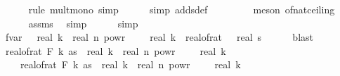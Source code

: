 \begin{isabellebody}
\ \ \ \ \isamarkupfalse%
\ {\isacharparenleft}{\kern0pt}rule\ mult{\isacharunderscore}{\kern0pt}mono{\isacharcomma}{\kern0pt}\ simp{\isacharparenright}{\kern0pt}\isanewline
\ \ \ \ \isamarkupfalse%
\ {\isacharparenleft}{\kern0pt}simp\ add{\isacharcolon}{\kern0pt}sdef{\isacharparenright}{\kern0pt}\ \isanewline
\ \ \ \ \ \ \isamarkupfalse%
\ {\isacharparenleft}{\kern0pt}meson\ of{\isacharunderscore}{\kern0pt}nat{\isacharunderscore}{\kern0pt}ceiling{\isacharparenright}{\kern0pt}\isanewline
\ \ \ \ \isamarkupfalse%
\ assms\ \isamarkupfalse%
\ simp\isanewline
\ \ \ \ \isamarkupfalse%
\ simp\isanewline
\ \ \isamarkupfalse%
\ \isamarkupfalse%
\ f{}{\isacharunderscore}{\kern0pt}var{\isacharunderscore}{\kern0pt}{}{\isacharcolon}{\kern0pt}\ {\isachardoublequoteopen}{}\ {\isacharasterisk}{\kern0pt}\ real\ k\ {\isacharasterisk}{\kern0pt}\ real\ n\ powr\ {\isacharparenleft}{\kern0pt}{}\ {\isacharminus}{\kern0pt}\ {}\ {\isacharslash}{\kern0pt}\ real\ k{\isacharparenright}{\kern0pt}\ {\isasymle}\ {\isacharparenleft}{\kern0pt}real{\isacharunderscore}{\kern0pt}of{\isacharunderscore}{\kern0pt}rat\ {\isasymdelta}{\isacharparenright}{\kern0pt}\ {\isacharasterisk}{\kern0pt}\ {\isacharparenleft}{\kern0pt}real\ s\isanewline
\ \ \ \ \isamarkupfalse%
\ blast\isanewline
\ \ \isamarkupfalse%
\ {\isachardoublequoteopen}{\isacharparenleft}{\kern0pt}real{\isacharunderscore}{\kern0pt}of{\isacharunderscore}{\kern0pt}rat\ {\isacharparenleft}{\kern0pt}F\ k\ as{\isacharparenright}{\kern0pt}{\isacharparenright}{\kern0pt}\ {\isacharasterisk}{\kern0pt}\ real\ k\ {\isacharasterisk}{\kern0pt}\ real\ n\ powr\ {\isacharparenleft}{\kern0pt}{}\ {\isacharminus}{\kern0pt}\ {}\ {\isacharslash}{\kern0pt}\ real\ k{\isacharparenright}{\kern0pt}\ {\isacharequal}{\kern0pt}\isanewline
\ \ \ \ {\isacharparenleft}{\kern0pt}real{\isacharunderscore}{\kern0pt}of{\isacharunderscore}{\kern0pt}rat\ {\isacharparenleft}{\kern0pt}F\ k\ as{\isacharparenright}{\kern0pt}{\isacharparenright}{\kern0pt}\ {\isacharasterisk}{\kern0pt}\ {\isacharparenleft}{\kern0pt}real\ k\ {\isacharasterisk}{\kern0pt}\ real\ n\ powr\ {\isacharparenleft}{\kern0pt}{}\ {\isacharminus}{\kern0pt}\ {}\ {\isacharslash}{\kern0pt}\ real\ k{\isacharparenright}{\kern0pt}{\isacharparenright}{\kern0pt}{\isachardoublequoteclose}\isanewline

\end{isabellebody}
